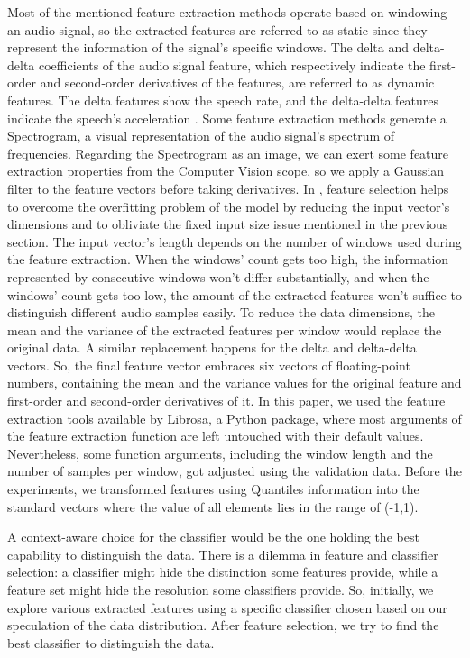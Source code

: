 \documentclass{article}
\begin{document}
Most of the mentioned feature extraction methods operate based on windowing an audio signal, so the extracted features are referred to as static since they represent the information of the signal's specific windows. The delta and delta-delta coefficients of the audio signal feature, which respectively indicate the first-order and second-order derivatives of the features, are referred to as dynamic features. The delta features show the speech rate, and the delta-delta features indicate the speech's acceleration \citep{Features}. Some feature extraction methods generate a Spectrogram, a visual representation of the audio signal's spectrum of frequencies. Regarding the Spectrogram as an image, we can exert some feature extraction properties from the Computer Vision scope, so we apply a Gaussian filter to the feature vectors before taking derivatives. In \citep{Elements}, feature selection helps to overcome the overfitting problem of the model by reducing the input vector's dimensions and to obliviate the fixed input size issue mentioned in the previous section. The input vector's length depends on the number of windows used during the feature extraction. When the windows' count gets too high, the information represented by consecutive windows won't differ substantially, and when the windows' count gets too low, the amount of the extracted features won't suffice to distinguish different audio samples easily. To reduce the data dimensions, the mean and the variance of the extracted features per window would replace the original data. A similar replacement happens for the delta and delta-delta vectors. So, the final feature vector embraces six vectors of floating-point numbers, containing the mean and the variance values for the original feature and first-order and second-order derivatives of it. In this paper, we used the feature extraction tools available by Librosa, a Python package, where most arguments of the feature extraction function are left untouched with their default values. Nevertheless, some function arguments, including the window length and the number of samples per window, got adjusted using the validation data. Before the experiments, we transformed features using Quantiles information into the standard vectors where the value of all elements lies in the range of (-1,1).

A context-aware choice for the classifier would be the one holding the best capability to distinguish the data. There is a dilemma in feature and classifier selection: a classifier might hide the distinction some features provide, while a feature set might hide the resolution some classifiers provide. So, initially, we explore various extracted features using a specific classifier chosen based on our speculation of the data distribution. After feature selection, we try to find the best classifier to distinguish the data. 
\end{document}

